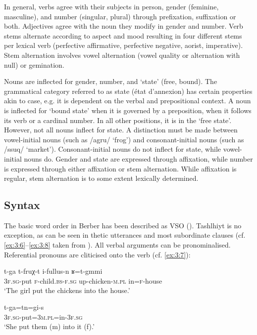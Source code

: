In general, verbs agree with their subjects in person, gender (feminine, masculine), and number (singular, plural) through prefixation, suffixation or both. Adjectives agree with the noun they modify in gender and number. Verb stems alternate according to aspect and mood resulting in four different stems per lexical verb (perfective affirmative, perfective negative, aorist, imperative). Stem alternation involves vowel alternation (vowel quality or alternation with null) or gemination.

Nouns are inflected for gender, number, and ‘state’ (free, bound). The grammatical category referred to as state (état d’annexion) has certain properties akin to case, e.g. it is dependent on the verbal and prepositional context. A noun is inflected for ‘bound state’ when it is governed by a preposition, when it follows its verb or a cardinal number. In all other positions, it is in the ‘free state’. However, not all nouns inflect for state. A distinction must be made between vowel-initial nouns (such as /agru/ ‘frog’) and consonant-initial nouns (such as /ssuq/ ‘market’). Consonant-initial nouns do not inflect for state, while vowel-initial nouns do. Gender and state are expressed through affixation, while number is expressed through either affixation or stem alternation. While affixation is regular, stem alternation is to some extent lexically determined. 

\subsection{Syntax}\label{sec:3.4.4}
The basic word order in Berber has been described as VSO (\citealt{Basset1952,Sasse1984}). Tashlhiyt is no exception, as can be seen in thetic utterances and most subordinate clauses (cf. \ref{ex:3:6}--\ref{ex:3:8} taken from \citealt[17]{DE2002}). All verbal arguments can be pronominalised. Referential pronouns are cliticised onto the verb (cf. \ref{ex:3:7}):

\ea\label{ex:3:6} 
\gll  t-ga t-fruχ-t i-fullus-n ʁ=t-gmmi \\
      \textsc{3f.sg}-put \textsc{f}-child.\textsc{bs-f.sg} up-chicken-\textsc{m.pl} in=\textsc{f}-house \\
\glt ‘The girl put the chickens into the house.’
\z

\ea\label{ex:3:7} 
\gll  t-ga=tn=gi-s \\
      \textsc{3f.sg}-put=\textsc{3m.pl}=in-\textsc{3f.sg} \\
\glt ‘She put them (m) into it (f).’
\z

